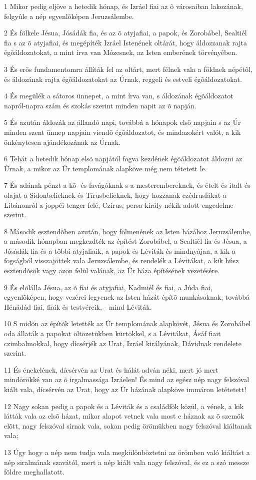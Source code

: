 \par 1 Mikor pedig eljöve a hetedik hónap, és Izráel fiai az õ városaiban lakozának, felgyûle a nép egyenlõképen Jeruzsálembe.
\par 2 És fölkele Jésua, Jósádák fia, és az õ atyjafiai, a papok, és  Zorobábel, Sealtiél fia s az õ atyjafiai, és megépíték Izráel Istenének oltárát, hogy áldozzanak rajta égõáldozatokat, a mint írva van Mózesnek, az Isten emberének törvényében.
\par 3 És erõs fundamentomra állíták fel az oltárt, mert félnek vala a földnek népétõl, és áldozának rajta égõáldozatokat az Úrnak, reggeli és estveli égõáldozatokat.
\par 4 És megülék a sátoros ünnepet, a mint írva van, s áldozának égõáldozatot napról-napra szám és szokás szerint minden napit az õ napján.
\par 5 És azután áldozák az állandó napi, továbbá a hónapok elsõ napjain s az Úr minden szent ünnep napjain viendõ égõáldozatot, és mindazokért valót, a kik önkénytesen ajándékozának az Úrnak.
\par 6 Tehát a hetedik hónap elsõ napjától fogva kezdének égõáldozatot áldozni az Úrnak, a mikor az Úr templomának alapköve még nem tétetett le.
\par 7 És adának pénzt a kõ- és favágóknak s a mesterembereknek, és ételt és italt és olajat a Sidonbelieknek és Tírusbelieknek, hogy hozzanak czédrusfákat a Libánonról a joppéi tenger felé, Czírus, persa király nékik adott engedelme szerint.
\par 8 Második esztendõben azután, hogy fölmenének az Isten házához Jeruzsálembe, a második hónapban megkezdték az építést Zorobábel, a Sealtiél fia és Jésua, a Jósádák fia és a többi atyjafiaik, a papok és Léviták és mindnyájan, a kik a fogságból visszajöttek vala Jeruzsálembe, és rendelék a Lévitákat, a kik húsz esztendõsök vagy azon felül valának, az Úr háza építésének vezetésére.
\par 9 És elõlálla Jésua, az õ fiai és atyjafiai, Kadmiél és fiai, a Júda fiai, egyenlõképen, hogy vezérei legyenek az Isten házát építõ munkásoknak, továbbá Hénádád fiai, fiaik és testvéreik, - mind Léviták.
\par 10 S midõn az építõk letették az Úr templomának alapkövét, Jésua és Zorobábel oda állaták a papokat öltözetükben kürtökkel, s a Lévitákat, Ásáf fiait czimbalmokkal, hogy dícsérjék az Urat, Izráel királyának, Dávidnak rendelete szerint.
\par 11 És énekelének, dícsérvén az Urat és hálát adván néki, mert jó mert mindörökké van az õ irgalmassága Izráelen! És mind az egész nép nagy felszóval kiált vala, dícsérvén az Urat, hogy az Úr házának alapköve immáron letétetett!
\par 12 Nagy sokan pedig a papok és a Léviták és a családfõk közül, a vének, a kik látták vala az elsõ házat, mikor alapot vetnek vala most e háznak az õ szemök elõtt, nagy felszóval sírnak vala, sokan pedig örömükben nagy felszóval kiáltanak vala;
\par 13 Úgy hogy a nép nem tudja vala megkülönböztetni az örömben való kiáltást a nép siralmának szavától, mert a nép kiált vala nagy felszóval, és ez a szó messze földre meghallatott.


